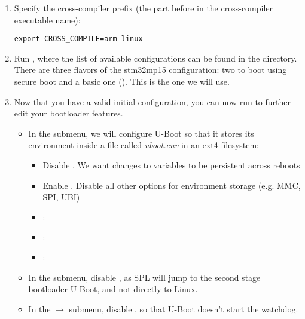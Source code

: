 \begin{enumerate}

\item Specify the cross-compiler prefix
(the part before  in the cross-compiler executable name):
\begin{verbatim}
export CROSS_COMPILE=arm-linux-
\end{verbatim}

\item Run , where the list of available
  configurations can be found in the  directory. There
  are three flavors of the stm32mp15 configuration: two to boot using
  secure boot and a basic one (). This is the
  one we will use.

\item Now that you have a valid initial configuration, you can now
  run  to further edit your bootloader features.
  \begin{itemize}
  \item In the  submenu, we will configure U-Boot so
    that it stores its environment inside a file called {\em
      uboot.env} in an ext4 filesystem:
    \begin{itemize}
    \item Disable . We want changes to variables to
        be persistent across reboots
    \item Enable . Disable all other
        options for environment storage (e.g. MMC, SPI, UBI)
    \item {}: 
    \item {}: 
    \item {}: 
    \end{itemize}

  \item In the  submenu, disable , as
     SPL will jump to the second stage bootloader U-Boot, and not directly to Linux.

  \item In the  $\rightarrow$  submenu, disable , so that U-Boot doesn't start the
    watchdog.
  \end{itemize}


\end{enumerate}
